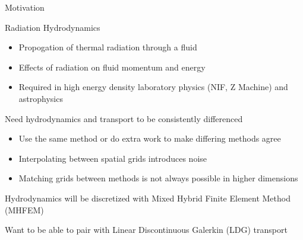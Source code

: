 \documentclass[10pt]{beamer}
\begin{document}
\begin{frame}{Motivation}

	\scriptsize
	Radiation Hydrodynamics 
	\vspace{-.05in}
	    \begin{itemize}
            \item Propogation of thermal radiation through a fluid
            \item Effects of radiation on fluid momentum and energy 
	    	\item Required in high energy density laboratory physics (NIF, Z Machine) and astrophysics 
	    \end{itemize}


   	Need hydrodynamics and transport to be consistently differenced  
   	\vspace{-.05in}
   	\begin{itemize}
   		\item Use the same method or do extra work to make differing methods agree 
   	    \item Interpolating between spatial grids introduces noise 
   	    \item Matching grids between methods is not always possible in higher dimensions 
   	\end{itemize}

   	Hydrodynamics will be discretized with Mixed Hybrid Finite Element Method (MHFEM) 

   	Want to be able to pair with Linear Discontinuous Galerkin (LDG) transport 





\end{frame}
\end{document}

